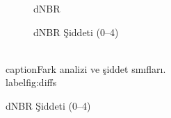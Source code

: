 \documentclass[11pt,a4paper]{article}
\begin{document}
\begin{figure}[H]
  \centering
  \begin{subfigure}[b]{0.48\textwidth}
    \centering
    \caption{dNBR}
  \end{subfigure}\hfill
  \begin{subfigure}[b]{0.48\textwidth}
    \centering
    \caption{dNBR Şiddeti (0--4)}
  \end{subfigure}
  \\caption{Fark analizi ve şiddet sınıfları.}
  \\label{fig:diffs}
\end{figure}
\end{document}
